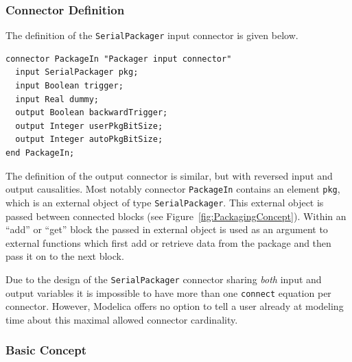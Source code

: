 \documentclass{resources/modelica}
\newcommand{\modelica}[1]{\lstinline[language=modelica]|#1|}
\begin{document}
\subsubsection{Connector Definition}

The definition of the \modelica{SerialPackager} input connector is given below.
\begin{lstlisting}[language=modelica]
connector PackageIn "Packager input connector"
  input SerialPackager pkg;
  input Boolean trigger;
  input Real dummy;
  output Boolean backwardTrigger;
  output Integer userPkgBitSize;
  output Integer autoPkgBitSize;
end PackageIn;
\end{lstlisting}
The definition of the output connector is similar, but with reversed input and
output causalities. Most notably connector \modelica{PackageIn} contains an
element \modelica{pkg}, which is an external object of type \modelica{SerialPackager}.
This external object is passed between connected blocks (see
Figure~\ref{fig:PackagingConcept}). Within an ``add'' or ``get'' block the
passed in external object is used as an argument to external functions which
first add or retrieve data from the package and then pass it on to the next block.

Due to the design of the \modelica{SerialPackager} connector sharing \emph{both} input and output variables it is impossible to have more than one \modelica{connect} equation per connector.
However, Modelica offers no option to tell a user already at modeling time about this maximal allowed connector cardinality.

\subsubsection{Basic Concept}
\end{document}
